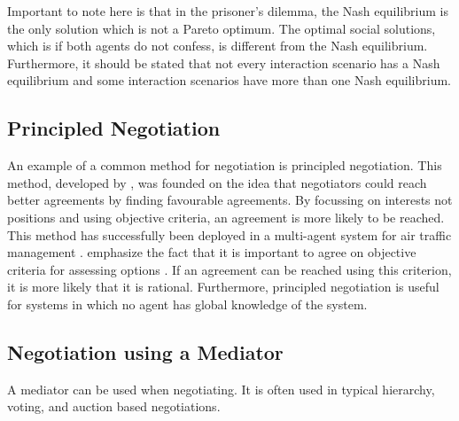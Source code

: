 Important to note here is that in the prisoner's dilemma, the Nash equilibrium is the only solution which is not a Pareto optimum.  The optimal social solutions, which is if both agents do not confess, is different from the Nash equilibrium.  Furthermore, it should be stated that not every interaction scenario has a Nash equilibrium and some interaction scenarios have more than one Nash equilibrium. 
\subsection{Principled Negotiation}
\label{sec:principlednegotiation}
An example of a common method for negotiation is principled negotiation. This method, developed by \citet{fisher1987getting}, was founded on the idea that negotiators could reach better agreements by finding favourable agreements. By focussing on interests not positions and using objective criteria, an agreement is more likely to be reached. This method has successfully been deployed in a multi-agent system for air traffic management \citep{wangermann1998principled}. \citet{fisher1987getting} emphasize the fact that it is important to agree on objective criteria for assessing options \citep{fisher1987getting}. If an agreement can be reached using this criterion, it is more likely that it is rational. Furthermore, principled negotiation is useful for systems in which no agent has global knowledge of the system.





\subsection{Negotiation using a Mediator}
A mediator can be used when negotiating. It is often used in typical hierarchy, voting, and auction based negotiations. 

